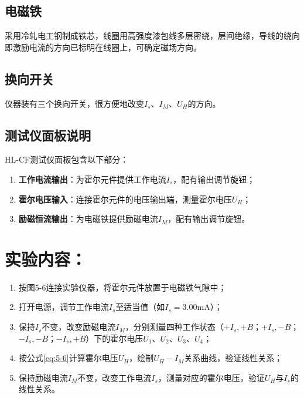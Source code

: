 \subsection{电磁铁}

采用冷轧电工钢制成铁芯，线圈用高强度漆包线多层密绕，层间绝缘，导线的绕向即激励电流的方向已标明在线圈上，可确定磁场方向。

\subsection{换向开关}

仪器装有三个换向开关，很方便地改变$I_s$、$I_M$、$U_H$的方向。

\subsection{测试仪面板说明}

HL-CF测试仪面板包含以下部分：
\begin{enumerate}[label=\arabic* 、, leftmargin=4em, labelsep=0pt]
    \item \textbf{工作电流输出}：为霍尔元件提供工作电流$I_s$，配有输出调节旋钮；
    \item \textbf{霍尔电压输入}：连接霍尔元件的电压输出端，测量霍尔电压$U_H$；
    \item \textbf{励磁恒流输出}：为电磁铁提供励磁电流$I_M$，配有输出调节旋钮。
\end{enumerate}


\section{实验内容：}
\begin{enumerate}[label=\arabic* 、, leftmargin=4em, labelsep=0pt]
    \item 按图5-6连接实验仪器，将霍尔元件放置于电磁铁气隙中；
    \item 打开电源，调节工作电流$I_s$至适当值（如$I_s=3.00\text{mA}$）；
    \item 保持$I_s$不变，改变励磁电流$I_M$，分别测量四种工作状态（$+I_s,+B$；$+I_s,-B$；$-I_s,-B$；$-I_s,+B$）下的霍尔电压$U_1$、$U_2$、$U_3$、$U_4$；
    \item 按公式\eqref{eq:5-6}计算霍尔电压$U_H$，绘制$U_H-I_M$关系曲线，验证线性关系；
    \item 保持励磁电流$I_M$不变，改变工作电流$I_s$，测量对应的霍尔电压，验证$U_H$与$I_s$的线性关系。
\end{enumerate}

